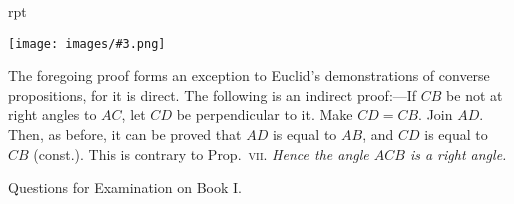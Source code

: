 \documentclass[oneside]{book}
\newcounter{wrapwidth}
\newcommand\exhead[1]{
\Needspace*{5\baselineskip}\begin{center}
\textsf{#1}
\end{center}
}
\newcommand\imgflow[3]{
\setcounter{wrapwidth}{#1}
\begin{wrapfigure}[#2]{r}{\value{wrapwidth}pt}
\begin{center}
\vspace{-0.3in}
\texttt{[image: images/\#3.png]}
\end{center}
\end{wrapfigure}
}
\begin{document}

\imgflow{125}{7}{f071}

\begin{footnotesize}
The foregoing proof forms an exception to Euclid's demonstrations
of converse propositions, for it
is direct. The following is an indirect
proof:---If $CB$ be not at right
angles to $AC$, let $CD$ be perpendicular
to it. Make $CD = CB$. Join $AD$.
Then, as before, it can be proved
that $AD$ is equal to $AB$, and $CD$ is
equal to $CB$ (const.). This is contrary
to Prop.~\textsc{vii}. \emph{Hence the angle $ACB$ is a right angle.}
\par\end{footnotesize}

\exhead{Questions for Examination on Book I.}
\end{document}
